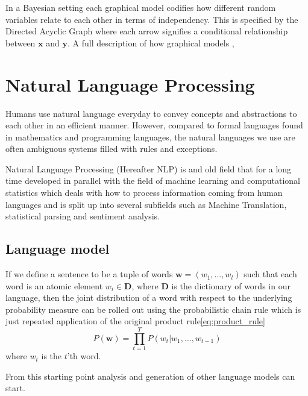 In a Bayesian setting each graphical model codifies how different random variables relate
to each other in terms of independency. This is specified by the Directed
Acyclic Graph where each arrow signifies a conditional relationship between
$\bm{x}$ and $\bm{y}$. A full description of how graphical models ,

\section{Natural Language Processing}

Humans use natural language everyday to convey concepts and abstractions to each
other in an efficient manner. However, compared to formal languages found in
mathematics and programming languages, the natural languages we use are often
ambiguous systems filled with rules and exceptions\cite{Rosenfeld00twodecades, sep-computational-linguistics}.

Natural Language Processing (Hereafter NLP) is and old field that for a long
time developed in parallel with the field of machine learning and
computational statistics which deals with how to process information coming from
human languages and is split up into several subfields such as Machine
Translation, statistical parsing and sentiment analysis\cite{sep-computational-linguistics}.

\subsection{Language model}
If we define a sentence to be a tuple of words $\bm{w} = (w_1, \dots,
w_l)$ such that each word is an atomic element $w_i \in \mathbf{D}$, where $\mathbf{D}$ is the
dictionary of words in our language, then the joint distribution of a word with
respect to the underlying probability measure can be rolled out using the
probabilistic chain rule which is just repeated application of the original
product rule\ref{eq:product_rule}
\begin{equation}
  \label{eq:conditional_language_probability}
  P(\bm{w}) = \prod_{t = 1}^TP(w_t | w_1, \dots, w_{t-1})
\end{equation}
where $w_t$ is the $t$'th word.\cite{Bengio:2003:NPL:944919.944966}

From this starting point analysis and generation of other language models can start.

